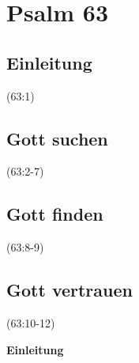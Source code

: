 \documentclass[14pt]{../../inc/mybib}
\author{Lothar Schmid}
\newenvironment{block}[1][]{%
  \vspace{1.5em}%
  \noindent\textbf{#1}\par%
  \vspace{0.0em}%
}{%
  \vspace{1em}%
}
\begin{document}
\setlength{\baselineskip}{1.5\baselineskip}

\section*{Psalm 63}
    \subsection{Einleitung}
    (63:1)
    \subsection{Gott suchen}
    (63:2-7)
    \subsection{Gott finden}
    (63:8-9)
    \subsection{Gott vertrauen}
    (63:10-12)

    \begin{block}[Einleitung]
    \end{block}
\end{document}

